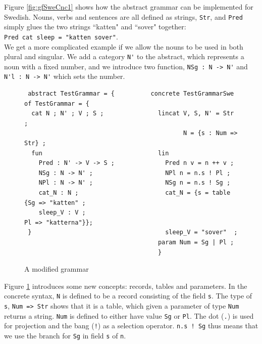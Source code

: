 \documentclass{report}
\begin{document}
Figure \ref{fig:gfSweCnc1} shows how the abstract grammar can be implemented
for Swedish. Nouns, verbs and sentences are all defined as strings, \verb|Str|,
and \verb|Pred| simply glues the two strings ``katten" and ``sover" together:\\
\verb|Pred cat sleep = "katten sover"|.\\
We get a more complicated example if we allow the nouns to be used in both
plural and singular. We add a category \verb|N'| to the
abstract, which represents a noun with a fixed number,
and we introduce two function, \verb|NSg : N -> N'| and
\verb|N'l : N -> N'| which sets the number.
\begin{figure}[h!]
\begin{verbatim}              
 abstract TestGrammar = {          concrete TestGrammarSwe of TestGrammar = {
  cat N ; N' ; V ; S ;               lincat V, S, N' = Str ;
                                            N = {s : Num => Str} ;
  fun                                lin   
    Pred : N' -> V -> S ;              Pred n v = n ++ v ;
    NSg : N -> N' ;                    NPl n = n.s ! Pl ;
    NPl : N -> N' ;                    NSg n = n.s ! Sg ;
    cat_N : N ;                        cat_N = {s = table {Sg => "katten" ;
    sleep_V : V ;                                          Pl => "katterna"}};
 }                                     sleep_V = "sover"  ;
                                     param Num = Sg | Pl ;
                                     }
\end{verbatim}           
\caption{A modified grammar}
\label{fig:gfTest2}
\end{figure}
Figure \ref{fig:gfTest2} introduces some new concepts: records, tables and parameters.
In the concrete syntax, \verb|N| is defined to be a record consisting of the field
\verb|s|. The type of \verb|s|, \verb-Num => Str- shows that it is a table, which given a
parameter of type \verb|Num| returns a string. \verb|Num| is defined 
to either have value \verb|Sg| or \verb|Pl|. 
The dot (\verb-.-) is used for projection and the bang (\verb-!-) as a selection operator.
\verb|n.s ! Sg| thus means that we use the branch for \verb-Sg- in
field \verb|s| of \verb|n|.
\end{document}
